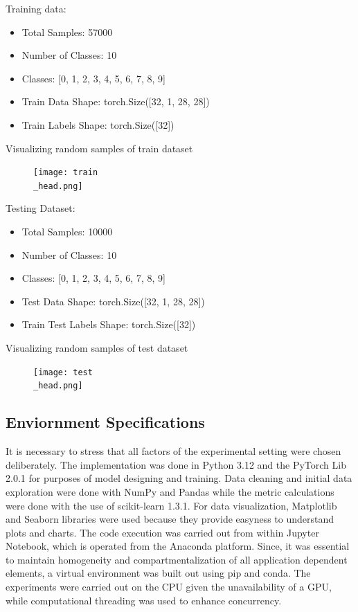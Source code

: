 \documentclass[conference]{IEEEtran}
\begin{document}
Training data:
\begin{itemize}
    \item Total Samples: 57000
    \item Number of Classes: 10
    \item Classes: [0, 1, 2, 3, 4, 5, 6, 7, 8, 9]
  \item Train Data Shape: torch.Size([32, 1, 28, 28])
  \item Train Labels Shape: torch.Size([32])
\end{itemize}
\vspace{0.3cm}
Visualizing random samples of train dataset

\begin{figure}[h]
    \centering
    \texttt{[image: train\\\_head.png]}
\end{figure}


Testing Dataset:
\begin{itemize}
    \item Total Samples: 10000
    \item Number of Classes: 10
    \item Classes: [0, 1, 2, 3, 4, 5, 6, 7, 8, 9]
  \item Test Data Shape: torch.Size([32, 1, 28, 28])
  \item Train Test Labels Shape: torch.Size([32])
\end{itemize}
\vspace{0.3cm}
Visualizing random samples of test dataset

\begin{figure}[h]
    \centering
    \texttt{[image: test\\\_head.png]}
\end{figure}


\subsection{Enviornment Specifications}
It is necessary to stress that all factors of the experimental setting were chosen deliberately. The implementation was done in Python 3.12 and the PyTorch Lib 2.0.1 for purposes of model designing and training. Data cleaning and initial data exploration were done with NumPy and Pandas while the metric calculations were done with the use of scikit-learn 1.3.1. For data visualization, Matplotlib and Seaborn libraries were used because they provide easyness to understand plots and charts. The code execution was carried out from within Jupyter Notebook, which is operated from the Anaconda platform. Since, it was essential to maintain homogeneity and compartmentalization of all application dependent elements, a virtual environment was built out using pip and conda. The experiments were carried out on the CPU given the unavailability of a GPU, while computational threading was used to enhance concurrency.
\end{document}
